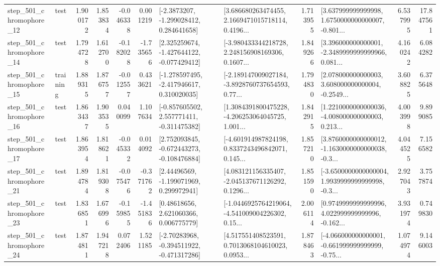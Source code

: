 \begin{tabular}{llrrrrllrlrr}
  step\_501\_chromophore\_12 &      test &      1.900172 &    1.853834 &     -0.046338 &  0.001219 &     [-2.3873207, -1.299028412, 0.284641658] &  [3.686680263474455, 2.1669471015718114, 0.4196... &       1.713955 &  [3.637999999999998, 1.6750000000000007, -0.801... &            6.537995 &         17.847561 \\
  step\_501\_chromophore\_14 &      test &      1.794728 &    1.612700 &     -0.182028 & -1.735656 &   [2.325259674, -1.427644122, -0.077429412] &  [-3.980433344218728, 2.248156908169306, 0.1607... &       1.849266 &  [3.396000000000001, -2.3489999999999966, 0.081... &            4.160242 &          6.084282 \\
  step\_501\_chromophore\_15 &  training &      1.889315 &    1.876757 &     -0.012557 &  0.433621 &   [-1.278597495, -2.417946617, 0.310020035] &  [-2.189147009027184, -3.8928760737654593, 0.77... &       1.794830 &  [2.078000000000003, 3.608000000000004, -0.2549... &            3.608825 &          6.375648 \\
  step\_501\_chromophore\_16 &      test &      1.863437 &    1.903535 &      0.040099 &  1.107634 &   [-0.857605502, 2.557771411, -0.311475382] &  [1.3084391800475228, -4.206253064045725, 1.001... &       1.842915 &  [1.2210000000000036, -4.008000000000003, 0.213... &            4.003998 &          9.899085 \\
  step\_501\_chromophore\_17 &      test &      1.863954 &    1.818621 &     -0.045332 &  0.014092 &   [2.752093845, -0.672443273, -0.108476884] &  [-4.601914987824198, 0.8337243496842071, 0.145... &       1.857210 &  [3.8760000000000012, -1.1630000000000038, -0.3... &            4.044525 &          7.156582 \\
  step\_501\_chromophore\_21 &      test &      1.894784 &    1.819308 &     -0.075476 & -0.371762 &     [2.44496569, -1.199071969, 0.299972941] &  [4.083121156335407, -2.045137671126292, 0.1296... &       1.851590 &  [-3.6500000000000004, 1.9939999999999998, -0.3... &            2.927043 &          3.757874 \\
  step\_501\_chromophore\_23 &      test &      1.836851 &    1.676996 &     -0.159855 & -1.451836 &      [0.48618656, 2.621060366, 0.006775779] &  [-1.0446925764219064, -4.541009004226302, 0.15... &       2.006114 &  [0.9749999999999996, 4.022999999999996, -0.162... &            3.931974 &          0.749830 \\
  step\_501\_chromophore\_24 &      test &      1.874811 &    1.947218 &      0.072406 &  1.521185 &   [-2.70283968, -0.394511922, -0.471317286] &  [4.517551408523591, 0.7013068104610023, 0.0953... &       1.878463 &  [-4.066000000000001, -0.661999999999999, -0.75... &            1.074974 &          9.146003 \\

\end{tabular}
